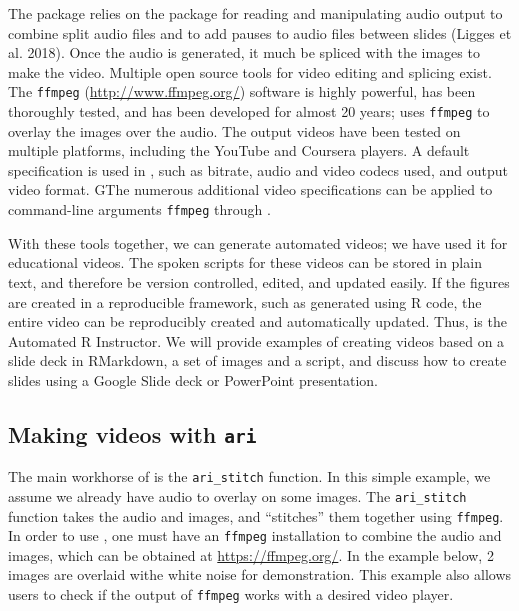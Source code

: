 The  package relies on the  package for reading
and manipulating audio output to combine split audio files and to add
pauses to audio files between slides (Ligges et al. 2018). Once the
audio is generated, it much be spliced with the images to make the
video. Multiple open source tools for video editing and splicing exist.
The \texttt{ffmpeg} (\url{http://www.ffmpeg.org/}) software is highly
powerful, has been thoroughly tested, and has been developed for almost
20 years;  uses \texttt{ffmpeg} to overlay the images over the
audio. The output videos have been tested on multiple platforms,
including the YouTube and Coursera players. A default specification is
used in , such as bitrate, audio and video codecs used, and
output video format. GThe numerous additional video specifications can
be applied to command-line arguments \texttt{ffmpeg} through .

With these tools together, we can generate automated videos; we have
used it for educational videos. The spoken scripts for these videos can
be stored in plain text, and therefore be version controlled, edited,
and updated easily. If the figures are created in a reproducible
framework, such as generated using R code, the entire video can be
reproducibly created and automatically updated. Thus,  is the
Automated R Instructor. We will provide examples of creating videos
based on a slide deck in RMarkdown, a set of images and a script, and
discuss how to create slides using a Google Slide deck or PowerPoint
presentation.

\hypertarget{making-videos-with-ari}{%
\subsection{\texorpdfstring{Making videos with
\texttt{ari}}{Making videos with ari}}\label{making-videos-with-ari}}

The main workhorse of  is the \texttt{ari\_stitch} function. In
this simple example, we assume we already have audio to overlay on some
images. The \texttt{ari\_stitch} function takes the audio and images,
and ``stitches'' them together using \texttt{ffmpeg}. In order to use
, one must have an \texttt{ffmpeg} installation to combine the
audio and images, which can be obtained at \url{https://ffmpeg.org/}. In
the example below, 2 images are overlaid withe white noise for
demonstration. This example also allows users to check if the output of
\texttt{ffmpeg} works with a desired video player.

